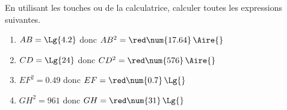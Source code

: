     En utilisant les touches  ou \Calculatrice{//$\sqrt{\phantom{rrr}}$} de la calculatrice, calculer toutes les expressions suivantes.

    \begin{enumerate}
        \item $AB=\Lg{4.2}$ donc $AB^2={\red \num{17.64}}\,\Aire{}$
        \item $CD=\Lg{24}$ donc $CD^2={\red\num{576}}\,\Aire{}$
        \item $EF^2=\num{0.49}$ donc $EF={\red\num{0.7}}\,\Lg{}$
        \item $GH^2=961$ donc $GH={\red\num{31}}\,\Lg{}$
    \end{enumerate}
